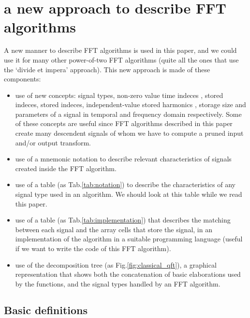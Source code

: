 \documentclass[a4paper,10pt]{article}
\begin{document}
\section{a new approach to describe FFT algorithms}


A new manner to describe FFT algorithms is used in this paper, and we could use it for many other power-of-two FFT algorithms (quite all the ones that use the `divide et impera' approach).
This new approach is made of these components:
\begin{itemize}

\item 
use of new concepts: signal types, non-zero value time indeces , stored  indeces, stored  indeces, independent-value stored harmonics , storage size  and  parameters of a signal in temporal and frequency domain respectively.
Some of these concepts are useful since FFT algorithms described in this paper create many descendent signals of whom we have to compute a pruned input and/or output transform.

\item
use of a mnemonic notation to describe relevant characteristics of signals created inside the FFT algorithm.

\item
use of a table (as Tab.\ref{tab:notation}) to describe the characteristics of any signal type used in an algorithm. 
We should look at this table while we read this paper.

\item
use of a table (as Tab.\ref{tab:implementation}) that describes the matching between each signal and the array cells that store the signal, in an implementation of the algorithm in a suitable programming language (useful if we want to write the code of this FFT algorithm).

\item
use of the decomposition tree (as Fig.\ref{fig:classical_qft}), a graphical representation that shows both the concatenation of basic elaborations used by the functions, and the signal types handled by an FFT algorithm.

\end{itemize}












\subsection{Basic definitions} \label{sec:definitions}
\end{document}
